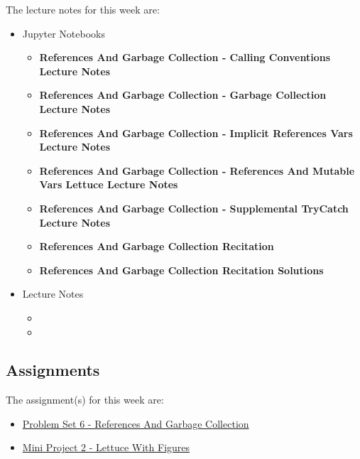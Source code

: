 \noindent The lecture notes for this week are:

\begin{itemize}
    \item Jupyter Notebooks
    \begin{itemize}
        \item \textbf{References And Garbage Collection - Calling Conventions Lecture Notes}
        \item \textbf{References And Garbage Collection - Garbage Collection Lecture Notes}
        \item \textbf{References And Garbage Collection - Implicit References Vars Lecture Notes}
        \item \textbf{References And Garbage Collection - References And Mutable Vars Lettuce Lecture Notes}
        \item \textbf{References And Garbage Collection - Supplemental TryCatch Lecture Notes}
        \item \textbf{References And Garbage Collection Recitation}
        \item \textbf{References And Garbage Collection Recitation Solutions}
    \end{itemize}
    \item Lecture Notes
    \begin{itemize}
        \item {}
        \item {}
    \end{itemize}
\end{itemize}

\subsection{Assignments}

The assignment(s) for this week are:

\begin{itemize}
    \item \href{https://github.com/QuantumCompiler/CU/tree/main/CSPB%203155%20-%20Principles%20Of%20Programming%20Languages/Assignments/Problem%20Sets/Problem%20Set%206%20-%20References%20And%20Garbage%20Collection}{Problem Set 6 - References And Garbage Collection}
    \item \href{https://github.com/QuantumCompiler/CU/tree/main/CSPB%203155%20-%20Principles%20Of%20Programming%20Languages/Assignments/Mini%20Projects/Mini%20Project%202%20-%20Lettuce%20With%20Figures}{Mini Project 2 - Lettuce With Figures}
\end{itemize}

